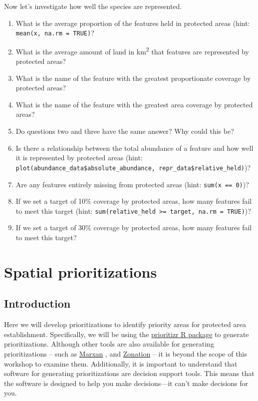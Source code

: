 \documentclass[
  12pt,
]{book}
\makeatletter
\providecommand{\tightlist}{%
  \setlength{\itemsep}{0pt}\setlength{\parskip}{0pt}}
\newenvironment{kframe}{%
\medskip{}
\setlength{\fboxsep}{.8em}
 \def\at@end@of@kframe{}%
 \ifinner\ifhmode%
  \def\at@end@of@kframe{\end{minipage}}%
  \begin{minipage}{\columnwidth}%
 \fi\fi%
 \def\FrameCommand##1{\hskip\@totalleftmargin \hskip-\fboxsep
 \colorbox{shadecolor}{##1}\hskip-\fboxsep
     \hskip-\linewidth \hskip-\@totalleftmargin \hskip\columnwidth}%
 \MakeFramed {\advance\hsize-\width
   \@totalleftmargin\z@ \linewidth\hsize
   \@setminipage}}%
 {\par\unskip\endMakeFramed%
 \at@end@of@kframe}
\newenvironment{rmdblock}[1]
  {
  \begin{itemize}
  \renewcommand{\labelitemi}{
    \raisebox{-.7\height}[0pt][0pt]{
      {\setkeys{Gin}{width=3em,keepaspectratio}\texttt{[image: images/\#1]}}
    }
  }
  \setlength{\fboxsep}{1em}
  \begin{kframe}
  \item
  }
  {
  \end{kframe}
  \end{itemize}
  }
\newenvironment{rmdquestion}
  {\begin{rmdblock}{question}}
  {\end{rmdblock}}
\makeatother
\begin{document}
Now let's investigate how well the species are represented.

\begin{rmdquestion}
\begin{enumerate}
\def\labelenumi{\arabic{enumi}.}
\tightlist
\item
  What is the average proportion of the features held in protected areas (hint: \texttt{mean(x,\ na.rm\ =\ TRUE)}?
\item
  What is the average amount of land in km\textsuperscript{2} that features are represented by protected areas?
\item
  What is the name of the feature with the greatest proportionate coverage by protected areas?
\item
  What is the name of the feature with the greatest area coverage by protected areas?
\item
  Do questions two and three have the same answer? Why could this be?
\item
  Is there a relationship between the total abundance of a feature and how well it is represented by protected areas (hint: \texttt{plot(abundance\_data\$absolute\_abundance,\ repr\_data\$relative\_held)})?
\item
  Are any features entirely missing from protected areas (hint: \texttt{sum(x\ ==\ 0)})?
\item
  If we set a target of 10\% coverage by protected areas, how many features fail to meet this target (hint: \texttt{sum(relative\_held\ \textgreater{}=\ target,\ na.rm\ =\ TRUE)})?
\item
  If we set a target of 30\% coverage by protected areas, how many features fail to meet this target?
\end{enumerate}
\end{rmdquestion}

\hypertarget{spatial-prioritizations}{%
\chapter{Spatial prioritizations}\label{spatial-prioritizations}}

\hypertarget{introduction-2}{%
\section{Introduction}\label{introduction-2}}

Here we will develop prioritizations to identify priority areas for protected area establishment. Specifically, we will be using the \href{https://prioritizr.net/}{prioritizr R package} to generate prioritizations. Although other tools are also available for generating prioritizations -- such as \href{http://marxan.org/}{Marxan} \citep{r9}, and \href{https://www.helsinki.fi/en/researchgroups/digital-geography-lab/software-developed-in-cbig\#section-52992}{Zonation} \citep{r10} -- it is beyond the scope of this workshop to examine them. Additionally, it is important to understand that software for generating prioritizations are decision support tools. This means that the software is designed to help you make decisions---it can't make decisions for you.
\end{document}
